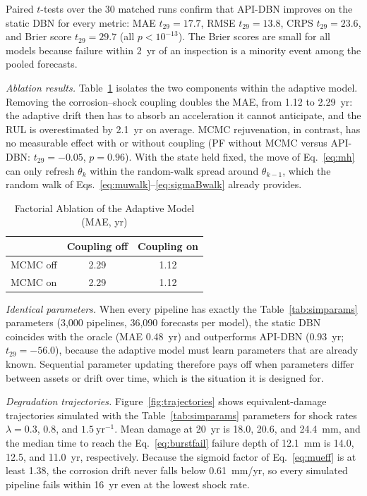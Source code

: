 \documentclass[journal]{IEEEtran}
\begin{document}
Paired $t$-tests over the 30 matched runs confirm that API-DBN improves
on the static DBN for every metric: MAE $t_{29}=17.7$, RMSE
$t_{29}=13.8$, CRPS $t_{29}=23.6$, and Brier score $t_{29}=29.7$ (all
$p<10^{-13}$). The Brier scores are small for all models because
failure within 2~yr of an inspection is a minority event among the
pooled forecasts.

\textit{Ablation results.}
Table~\ref{tab:ablation} isolates the two components within the
adaptive model. Removing the corrosion--shock coupling doubles the MAE,
from 1.12 to 2.29~yr: the adaptive drift then has to absorb an
acceleration it cannot anticipate, and the RUL is overestimated by
2.1~yr on average. MCMC rejuvenation, in contrast, has no measurable
effect with or without coupling (PF without MCMC versus API-DBN:
$t_{29}=-0.05$, $p=0.96$). With the state held fixed, the move of
Eq.~\eqref{eq:mh} can only refresh $\theta_k$ within the random-walk
spread around $\theta_{k-1}$, which the random walk of
Eqs.~\eqref{eq:muwalk}--\eqref{eq:sigmaBwalk} already provides.

\begin{table}[t]
\centering
\caption{Factorial Ablation of the Adaptive Model (MAE, yr)}
\label{tab:ablation}
\begin{tabular}{lcc}
\toprule
 & Coupling off & Coupling on \\
\midrule
MCMC off & 2.29 & 1.12 \\
MCMC on & 2.29 & 1.12 \\
\bottomrule
\end{tabular}
\end{table}

\textit{Identical parameters.}
When every pipeline has exactly the Table~\ref{tab:simparams}
parameters (3{,}000 pipelines, 36{,}090 forecasts per model), the static
DBN coincides with the oracle (MAE 0.48~yr) and outperforms API-DBN
(0.93~yr; $t_{29}=-56.0$), because the adaptive model must learn
parameters that are already known. Sequential parameter updating
therefore pays off when parameters differ between assets or drift over
time, which is the situation it is designed for.

\textit{Degradation trajectories.}
Figure~\ref{fig:trajectories} shows equivalent-damage trajectories
simulated with the Table~\ref{tab:simparams} parameters for shock rates
$\lambda=0.3$, $0.8$, and $1.5~\mathrm{yr}^{-1}$. Mean damage at 20~yr
is 18.0, 20.6, and 24.4~mm, and the median time to reach the
Eq.~\eqref{eq:burstfail} failure depth of 12.1~mm is 14.0, 12.5, and
11.0~yr, respectively. Because the sigmoid factor of
Eq.~\eqref{eq:mueff} is at least 1.38, the corrosion drift never falls
below 0.61~mm/yr, so every simulated pipeline fails within 16~yr even
at the lowest shock rate.
\end{document}
